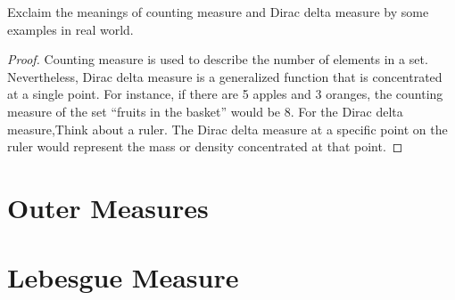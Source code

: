 \begin{exc}
    Exclaim the meanings of 
    counting measure and Dirac delta measure 
    by some examples in real world.
\end{exc}
\begin{proof}
    Counting measure is used to describe the number of elements in a set. 
    Nevertheless, Dirac delta measure is a generalized function that is concentrated at a single point.
    For instance, if there are 5 apples and 3 oranges, the counting measure of the set “fruits in the basket” would be 8.
    For the Dirac delta measure,Think about a ruler. The Dirac delta measure at a specific point on the ruler would 
    represent the mass or density concentrated at that point. 
\end{proof}
\section{Outer Measures}
\section{Lebesgue Measure}
